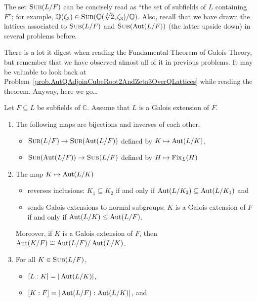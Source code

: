 The set $\operatorname{\textsc{Sub}}(L/F)$ can be concisely read as ``the set of subfields of $L$ containing $F$''; for example, $\mathbb{Q}(\zeta_3) \in \operatorname{\textsc{Sub}}(\mathbb{Q}(\sqrt[3]{2},\zeta_3)/\mathbb{Q})$. Also, recall that we have drawn the lattices associated to $\operatorname{\textsc{Sub}}(L/F)$ and $\operatorname{\textsc{Sub}}(\operatorname{Aut}(L/F))$ (the latter upside down) in several problems before. 

There is a lot it digest when reading the Fundamental Theorem of Galois Theory, but remember that we have observed almost all of it in previous problems. It may be valuable to look back at Problem~\ref{prob.AutQAdjoinCubeRoot2AndZeta3OverQLattices} while reading the theorem. Anyway, here we go\ldots

\begin{fact}\label{fact.FTGT}
Let $F\subseteq L$ be subfields of $\mathbb{C}$. Assume that $L$ is a Galois extension of $F$. \begin{enumerate}
\item The following maps are bijections and inverses of each other.
\begin{itemize}
\item $\operatorname{\textsc{Sub}}(L/F)\to \operatorname{\textsc{Sub}}(\operatorname{Aut}(L/F))$ defined by $K\mapsto \operatorname{Aut}(L/K)$,
\item $\operatorname{\textsc{Sub}}(\operatorname{Aut}(L/F))\to \operatorname{\textsc{Sub}}(L/F)$ defined by $H\mapsto \operatorname{Fix}_L(H)$
\end{itemize} 
\item\label{fact.FTGT.InclusionReverseAndGaloisToNormal} The map $K\mapsto \operatorname{Aut}(L/K)$ 
\begin{itemize}
\item reverses inclusions: $K_1\subseteq K_2$ if and only if $\operatorname{Aut}(L/K_2) \subseteq \operatorname{Aut}(L/K_1)$ and
\item sends Galois extensions to normal subgroups: $K$ is a Galois extension of $F$ if and only if $\operatorname{Aut}(L/K)\trianglelefteq \operatorname{Aut}(L/F)$.
\end{itemize}
Moreover, if $K$ is a Galois extension of $F$, then $\operatorname{Aut}(K/F)\cong \operatorname{Aut}(L/F)/\operatorname{Aut}(L/K)$.
\item For all $K\in \operatorname{\textsc{Sub}}(L/F)$, 
\begin{itemize}\label{fact.FTGT.DegreeMatchesIndex}
\item $[L:K] = |\operatorname{Aut}(L/K)|$,
\item $[K:F] = |\operatorname{Aut}(L/F):\operatorname{Aut}(L/K)|$, and 
\end{itemize}
\end{enumerate}
\end{fact}

